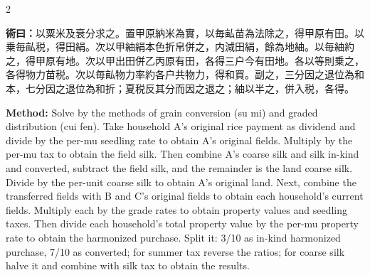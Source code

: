 \documentclass[11pt,a4paper]{article}
\newcommand{\MethodText}[1]{\par\noindent\textbf{\color{methodcolor}術曰：}#1\par}
\newcommand{\MethodEn}[1]{\par\noindent\textbf{\color{methodcolor}Method:} #1\par}
\begin{document}
\begin{paracol}{2}
\MethodText{以粟米及衰分求之。置甲原納米為實，以毎畆苗為法除之，得甲原有田。以乗毎畆税，得田絹。次以甲紬絹本色折帛併之，内減田絹，餘為地紬。以毎紬約之，得甲原有地。次以甲出田併乙丙原有田，各得三户今有田地。各以等則乗之，各得物力苗税。次以毎畆物力率約各户共物力，得和買。副之，三分因之退位為和本，七分因之退位為和折；夏税反其分而因之退之；紬以半之，併入税，各得。}
\switchcolumn
\MethodEn{Solve by the methods of grain conversion (su mi) and graded distribution (cui fen). Take household A's original rice payment as dividend and divide by the per-mu seedling rate to obtain A's original fields. Multiply by the per-mu tax to obtain the field silk. Then combine A's coarse silk and silk in-kind and converted, subtract the field silk, and the remainder is the land coarse silk. Divide by the per-unit coarse silk to obtain A's original land. Next, combine the transferred fields with B and C's original fields to obtain each household's current fields. Multiply each by the grade rates to obtain property values and seedling taxes. Then divide each household's total property value by the per-mu property rate to obtain the harmonized purchase. Split it: 3/10 as in-kind harmonized purchase, 7/10 as converted; for summer tax reverse the ratios; for coarse silk halve it and combine with silk tax to obtain the results.}
\switchcolumn*


\end{paracol}
\end{document}
